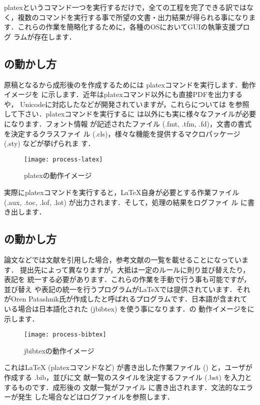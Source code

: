 platexというコマンド一つを実行するだけで，全ての工程を完了できる訳ではな
く，複数のコマンドを実行する事で所望の文書・出力結果が得られる事になりま
す．これらの作業を簡略化するために，各種のOSにおいてGUIの執筆支援プログ
ラムが存在します．


\subsection{\pLaTeX の動かし方}
原稿となるから成形後のを作成するためには
platexコマンドを実行します．動作イメージを
に示します．近年はplatexコマンド以外にも直接PDFを出力する\PDFLaTeX や，
Unicodeに対応した\upTeX などが開発されていますが，これらについては
を参照して下さい．platexコマンドを実行するに
は以外にも実に様々なファイルが必要になります．フォント情報
が記述されたファイル (.fmt, .tfm, .fd)，文書の書式を決定するクラスファイ
ル (.cls)，様々な機能を提供するマクロパッケージ (.sty) などが挙げられま
す．


\begin{figure}[htbp]
 \centering
 \texttt{[image: process-latex]}
 \caption{platexの動作イメージ}
\end{figure}

実際にplatexコマンドを実行すると，\LaTeX 自身が必要とする作業ファイル
(.aux, .toc, .lof, .lot) が出力されます．そして，処理の結果をログファイ
ル に書き出します．

\subsection{\JBibTeX の動かし方}
論文などでは文献を引用した場合，参考文献の一覧を載せることになっています．
提出先によって異なりますが，大抵は一定のルールに則り並び替えたり，表記を
統一する必要があります．これらの作業を手動で行う事も可能ですが，並び替え
や表記の統一を行うプログラムが\LaTeX では提供されています．それがOren
Patashnik氏が作成した\BibTeX と呼ばれるプログラムです．日本語が含まれて
いる場合は日本語化された{\JBibTeX} (jbibtex) を使う事になります．の{\JBibTeX}
動作イメージをに示します．
\begin{figure}[htbp]
 \centering
 \texttt{[image: process-bibtex]}
 \caption{jbibtexの動作イメージ}
\end{figure}
これは{\LaTeX} (platexコマンドなど) が書き出した作業ファイル
() と，ユーザが作成する .bib，並びに文
献一覧のスタイルを決定するファイル (.bst) を入力とするものです．成形後の
文献一覧がファイル  に書き出されます．文法的なエラーが発生
した場合などはログファイルを参照します．

